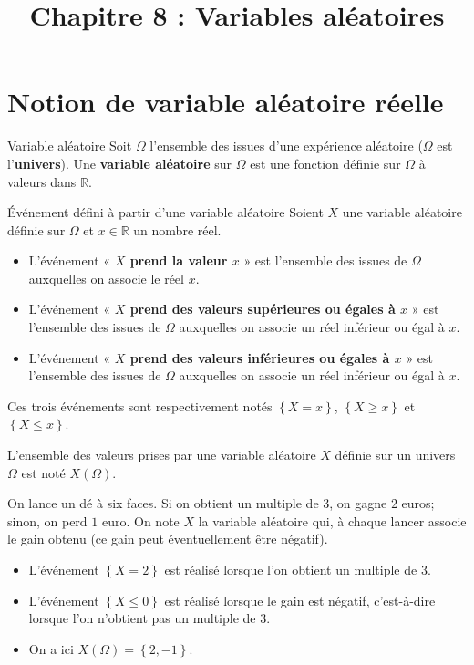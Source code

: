 \documentclass[11pt]{article}
\title{Chapitre 8 : Variables aléatoires}
\date{}
\author{}
\begin{document}
\maketitle\thispagestyle{fancy}

\section{Notion de variable aléatoire réelle}

\begin{defi}{Variable aléatoire}
  Soit $\Omega$ l'ensemble des issues d'une expérience aléatoire ($\Omega$ est
  l'\textbf{univers}). Une \textbf{variable aléatoire} sur $\Omega$ est une
  fonction définie sur $\Omega$ à valeurs dans $\mathbb{R}$.
\end{defi}

\begin{defi}{Événement défini à partir d'une variable aléatoire}
  Soient $X$ une variable aléatoire définie sur $\Omega$ et $x\in\mathbb{R}$ un
  nombre réel.
  \begin{itemize}
    \item L'événement « \textbf{$X$ prend la valeur $x$} » est l'ensemble des
      issues de $\Omega$ auxquelles on associe le réel $x$.
    \item L'événement « \textbf{$X$ prend des valeurs supérieures ou égales
      à $x$} » est l'ensemble des
      issues de $\Omega$ auxquelles on associe un réel inférieur ou égal à $x$.
    \item L'événement « \textbf{$X$ prend des valeurs inférieures ou égales
      à $x$} » est l'ensemble des
      issues de $\Omega$ auxquelles on associe un réel inférieur ou égal à $x$.
  \end{itemize}
\end{defi}
\begin{notation}
  Ces trois événements sont respectivement notés $\left\{ X=x \right\}$,
  $\left\{ X\geq x \right\}$ et $\left\{ X\leq x \right\}$.
\end{notation}

\begin{notation}
  L'ensemble des valeurs prises par une variable aléatoire $X$ définie sur un
  univers $\Omega$ est noté $X(\Omega)$.
\end{notation}

\begin{exemple}
  On lance un dé à six faces. Si on obtient un multiple de $3$, on gagne $2$
  euros; sinon, on perd $1$ euro. On note $X$ la variable aléatoire qui, à
  chaque lancer associe le gain obtenu (ce gain peut éventuellement être
  négatif).
  \begin{itemize}
    \item L'événement $\left\{ X=2 \right\}$ est réalisé lorsque l'on obtient un
      multiple de $3$.
    \item L'événement $\left\{ X\leq0 \right\}$ est réalisé lorsque le gain est
      négatif, c'est-à-dire lorsque l'on n'obtient pas un multiple de $3$.
    \item On a ici $X\left( \Omega \right)=\left\{ 2, -1 \right\}$.
  \end{itemize}
\end{exemple}
\end{document}
